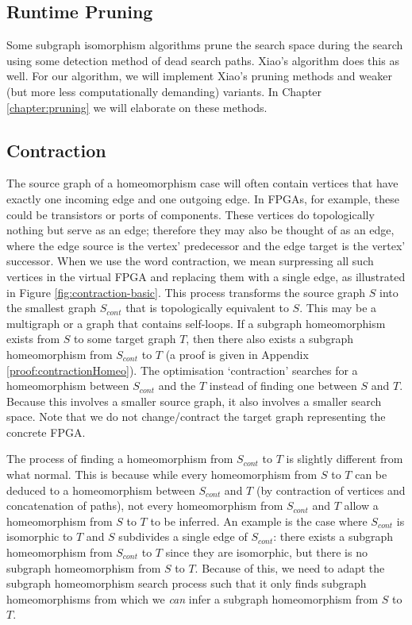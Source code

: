 \subsection{Runtime Pruning}
Some subgraph isomorphism algorithms \cite{Cordella2004, McCreesh2015} prune the search space during the search using some detection method of dead search paths. Xiao's algorithm does this as well. For our algorithm, we will implement Xiao's pruning methods and weaker (but more less computationally demanding) variants. In Chapter \ref{chapter:pruning} we will elaborate on these methods.

\subsection{Contraction}
\label{sec:contraction}
The source graph of a homeomorphism case will often contain vertices that have exactly one incoming edge and one outgoing edge. In FPGAs, for example, these could be transistors or ports of components. These vertices do topologically nothing but serve as an edge; therefore they may also be thought of as an edge, where the edge source is the vertex' predecessor and the edge target is the vertex' successor. When we use the word contraction, we mean surpressing all such vertices in the virtual FPGA and replacing them with a single edge, as illustrated in Figure \ref{fig:contraction-basic}. This process transforms the source graph $S$ into the smallest graph $S_{cont}$ that is topologically equivalent to $S$. This may be a multigraph or a graph that contains self-loops. If a subgraph homeomorphism exists from $S$ to some target graph $T$, then there also exists a subgraph homeomorphism from $S_{cont}$ to $T$ (a proof is given in Appendix \ref{proof:contractionHomeo}). The optimisation `contraction' searches for a homeomorphism between $S_{cont}$ and the $T$ instead of finding one between $S$ and $T$. Because this involves a smaller source graph, it also involves a smaller search space. Note that we do not change/contract the target graph representing the concrete FPGA.

The process of finding a homeomorphism from $S_{cont}$ to $T$ is slightly different from what normal. This is because while every homeomorphism from $S$ to $T$ can be deduced to a homeomorphism between $S_{cont}$ and $T$ (by contraction of vertices and concatenation of paths), not every homeomorphism from $S_{cont}$ and $T$ allow a homeomorphism from $S$ to $T$ to be inferred. An example is the case where $S_{cont}$ is isomorphic to $T$ and $S$ subdivides a single edge of $S_{cont}$: there exists a subgraph homeomorphism from $S_{cont}$ to $T$ since they are isomorphic, but there is no subgraph homeomorphism from $S$ to $T$. Because of this, we need to adapt the subgraph homeomorphism search process such that it only finds subgraph homeomorphisms from which we \textit{can} infer a subgraph homeomorphism from $S$ to $T$.

